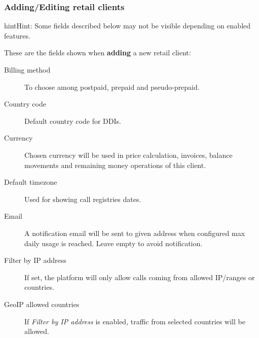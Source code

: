 \documentclass[letterpaper,10pt,english]{sphinxmanual}
\begin{document}
\subsubsection{Adding/Editing retail clients}
\label{administration_portal/brand/clients/retail:adding-editing-retail-clients}
\begin{notice}{hint}{Hint:}
Some fields described below may not be visible depending on enabled features.
\end{notice}

These are the fields shown when \textbf{adding} a new retail client:
\begin{description}
\item[{Billing method}] \leavevmode{}\label{administration_portal/brand/clients/retail:term-billing-method}
To choose among postpaid, prepaid and pseudo-prepaid.

\item[{Country code}] \leavevmode{}\label{administration_portal/brand/clients/retail:term-country-code}
Default country code for DDIs.

\item[{Currency}] \leavevmode{}\label{administration_portal/brand/clients/retail:term-currency}
Chosen currency will be used in price calculation, invoices, balance movements and
remaining money operations of this client.

\item[{Default timezone}] \leavevmode{}\label{administration_portal/brand/clients/retail:term-default-timezone}
Used for showing call registries dates.

\item[{Email}] \leavevmode{}\label{administration_portal/brand/clients/retail:term-email}
A notification email will be sent to given address when configured max daily usage is reached. Leave empty to
avoid notification.

\item[{Filter by IP address}] \leavevmode{}\label{administration_portal/brand/clients/retail:term-filter-by-ip-address}
If set, the platform will only allow calls coming from allowed IP/ranges or countries.

\item[{GeoIP allowed countries}] \leavevmode{}\label{administration_portal/brand/clients/retail:term-geoip-allowed-countries}
If \emph{Filter by IP address} is enabled, traffic from selected countries will be allowed.


\end{description}
\end{document}
